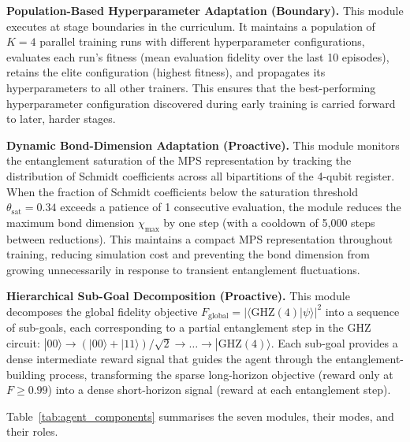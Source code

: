 \textbf{Population-Based Hyperparameter Adaptation (Boundary).}
This module executes at stage boundaries in the curriculum.
It maintains a population of $K = 4$ parallel training runs with different
hyperparameter configurations, evaluates each run's fitness (mean evaluation
fidelity over the last 10 episodes), retains the elite configuration (highest
fitness), and propagates its hyperparameters to all other trainers.
This ensures that the best-performing hyperparameter configuration discovered
during early training is carried forward to later, harder stages.

\textbf{Dynamic Bond-Dimension Adaptation (Proactive).}
This module monitors the entanglement saturation of the MPS representation by
tracking the distribution of Schmidt coefficients across all bipartitions of the
4-qubit register.
When the fraction of Schmidt coefficients below the saturation threshold
$\theta_\text{sat} = 0.34$ exceeds a patience of 1 consecutive evaluation,
the module reduces the maximum bond dimension $\chi_\text{max}$ by one step
(with a cooldown of 5,000 steps between reductions).
This maintains a compact MPS representation throughout training, reducing
simulation cost and preventing the bond dimension from growing unnecessarily in
response to transient entanglement fluctuations.

\textbf{Hierarchical Sub-Goal Decomposition (Proactive).}
This module decomposes the global fidelity objective
$F_\text{global} = |\langle \text{GHZ}(4) | \psi \rangle|^2$
into a sequence of sub-goals, each corresponding to a partial entanglement step
in the GHZ circuit:
$|00\rangle \rightarrow (|00\rangle + |11\rangle)/\sqrt{2}
\rightarrow \ldots \rightarrow |\text{GHZ}(4)\rangle$.
Each sub-goal provides a dense intermediate reward signal that guides the agent
through the entanglement-building process, transforming the sparse long-horizon
objective (reward only at $F \geq 0.99$) into a dense short-horizon signal
(reward at each entanglement step).

Table~\ref{tab:agent_components} summarises the seven modules, their modes, and
their roles.

